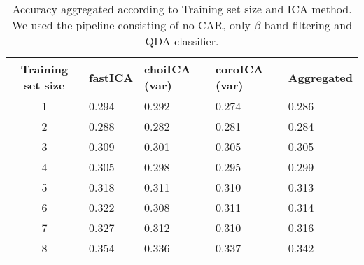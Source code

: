 	\begin{table}[ht]
		\centering
		\begin{small}
		\begin{tabular}{c|lll|l}
  			\hline
 			Training set size & fastICA & choiICA (var) & coroICA (var) & Aggregated\\ 
  			\hline
			1 & 0.294 & 0.292 & 0.274 & 0.286\\ 
			2 & 0.288 & 0.282 & 0.281 & 0.284\\ 
			3 & 0.309 & 0.301 & 0.305 & 0.305\\ 
			4 & 0.305 & 0.298 & 0.295 & 0.299\\ 
			5 & 0.318 & 0.311 & 0.310 & 0.313\\ 
			6 & 0.322 & 0.308 & 0.311 & 0.314\\ 
			7 & 0.327 & 0.312 & 0.310 & 0.316\\
			8 & 0.354 & 0.336 & 0.337 & 0.342\\ 
   			\hline
		\end{tabular}
		\end{small}
		\caption{Accuracy aggregated according to Training set size and ICA method. We used the pipeline consisting of no CAR, only $\beta$-band filtering and QDA classifier. }
		\label{tab:big-analysis}
	\end{table}








